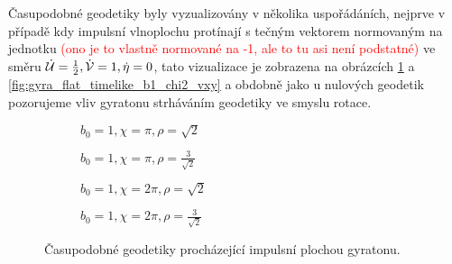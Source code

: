 Časupodobné geodetiky byly vyzualizovány v několika uspořádáních, nejprve v případě kdy impulsní
vlnoplochu protínají s tečným vektorem normovaným na jednotku \textcolor{red}{(ono je to vlastně normované na -1, ale to tu asi není podstatné)}
ve směru $\dot{\mathcal{U}}=\frac{1}{2}, \dot{\mathcal{V}} = 1, \dot{\eta}=0$, tato vizualizace je zobrazena na
obrázcích \ref{fig:gyra_flat_timelike_b1_chi1_2} a \ref{fig:gyra_flat_timelike_b1_chi2_vxy} a obdobně jako u
nulových geodetik pozorujeme vliv gyratonu strháváním geodetiky ve smyslu rotace.

\begin{figure}[H]
    \centering
    \begin{subfigure}[b]{0.48\textwidth}
         \caption{$b_0=1, \chi=\pi, \rho=\sqrt{2}$} 
    \end{subfigure}
    \begin{subfigure}[b]{0.48\textwidth}
         \caption{$b_0=1, \chi=\pi, \rho=\frac{3}{\sqrt{2}}$} 
    \end{subfigure}
    \hfill
    \begin{subfigure}[b]{0.48\textwidth}
         \caption{$b_0=1, \chi=2\pi, \rho=\sqrt{2}$} 
    \end{subfigure}
    \begin{subfigure}[b]{0.48\textwidth}
         \caption{$b_0=1, \chi=2\pi, \rho=\frac{3}{\sqrt{2}}$} 
    \end{subfigure}
    \caption{Časupodobné geodetiky procházející impulsní plochou gyratonu.}
    \label{fig:gyra_flat_timelike_b1_chi1_2}
\end{figure}

